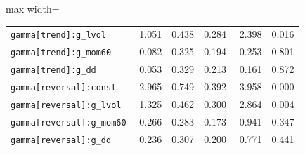 \begin{table}[!htbp]
\begin{adjustbox}{max width=\textwidth}
\begin{tabular}{lrrrrr}
\texttt{gamma[trend]:g\_lvol} & 1.051 & 0.438 & 0.284 & 2.398 & 0.016\\
\texttt{gamma[trend]:g\_mom60} & -0.082 & 0.325 & 0.194 & -0.253 & 0.801\\
\texttt{gamma[trend]:g\_dd} & 0.053 & 0.329 & 0.213 & 0.161 & 0.872\\
\texttt{gamma[reversal]:const} & 2.965 & 0.749 & 0.392 & 3.958 & 0.000\\
\texttt{gamma[reversal]:g\_lvol} & 1.325 & 0.462 & 0.300 & 2.864 & 0.004\\
\texttt{gamma[reversal]:g\_mom60} & -0.266 & 0.283 & 0.173 & -0.941 & 0.347\\
\texttt{gamma[reversal]:g\_dd} & 0.236 & 0.307 & 0.200 & 0.771 & 0.441\\
\bottomrule
\end{tabular}
\end{adjustbox}
\end{table}